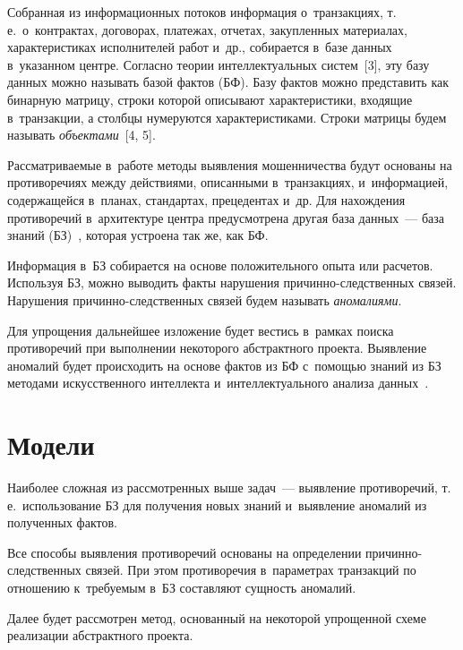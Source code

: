 \begin{multicols}{2}
  Собранная из информационных потоков информация о~транзакциях, т.\,е.\ 
о~контрактах, договорах, платежах, отчетах, закупленных материалах, 
характеристиках исполнителей работ и~др., собирается в~базе данных в~указанном 
центре. Согласно теории интеллектуальных сис\-тем~[3], эту базу данных можно 
называть базой фактов (БФ). Базу фактов можно представить как бинарную мат\-ри\-цу, 
строки которой описывают характеристики, входящие в~транзакции, а столбцы 
нумеруются характеристиками. Строки матрицы будем называть 
\textit{объектами}~[4, 5]. 
  
  Рассматриваемые в~работе методы выявления мошенничества будут основаны 
на противоречиях между действиями, описанными в~транзакциях, и~информацией, 
содержащейся в~планах, стандартах, прецедентах и~др. Для нахождения 
противоречий в~архитектуре центра предусмотрена другая база данных~--- база 
знаний (БЗ)~\cite{3-gr, 6-gr}, которая устроена так же, как БФ. 
  
  Информация в~БЗ собирается на основе положительного опыта или расчетов. 
Используя БЗ, можно выводить факты нарушения при\-чин\-но-след\-ст\-вен\-ных 
связей. Нарушения при\-чин\-но-след\-ст\-вен\-ных связей будем называть 
\textit{аномалиями}. 
  
  Для упрощения дальнейшее изложение будет вестись в~рамках поиска 
противоречий при выполнении некоторого абстрактного проекта. Выявление 
аномалий будет происходить на основе фактов из БФ с~помощью знаний из БЗ 
методами искусственного интеллекта и~интеллектуального анализа 
данных~\cite{6-gr}. 

\vspace*{-10pt}
  
  \section{Модели}
  
  \vspace*{-3pt}
  
  Наиболее сложная из рассмотренных выше задач~--- выявление противоречий, 
т.\,е.\ использование БЗ для получения новых знаний и~выявление аномалий из 
полученных фактов. 
  
  Все способы выявления противоречий основаны на определении 
  причинно-следственных связей. При этом противоречия в~параметрах транзакций по 
отношению к~требуемым в~БЗ составляют сущность аномалий. 
  
   Далее будет рассмотрен метод, основанный на некоторой упрощенной схеме 
реализации абстрактного проекта. 
  

\end{multicols}
